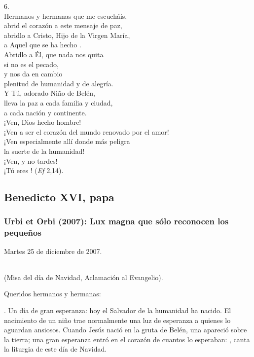 \begin{body}
\begin{body}
6. \\ Hermanos y hermanas que me escucháis,\\ abrid el corazón a este mensaje de paz,\\ abridlo a Cristo, Hijo de la Virgen María,\\ a Aquel que se ha hecho .\\ Abridlo a Él, que nada nos quita\\ si no es el pecado,\\ y nos da en cambio\\ plenitud de humanidad y de alegría.\\ Y Tú, adorado Niño de Belén,\\ lleva la paz a cada familia y ciudad,\\ a cada nación y continente.\\ ¡Ven, Dios hecho hombre!\\ ¡Ven a ser el corazón del mundo renovado por el amor!\\ ¡Ven especialmente allí donde más peligra\\ la suerte de la humanidad!\\ ¡Ven, y no tardes!\\ ¡Tú eres ! (\emph{Ef} 2,14).


\subsection{Benedicto XVI, papa}

\subsubsection{Urbi et Orbi (2007): Lux magna que sólo reconocen los pequeños}

Martes 25 de diciembre de 2007.

\\ (Misa del día de Navidad, Aclamación al Evangelio).

Queridos hermanos y hermanas:

. Un día de gran esperanza: hoy el Salvador de la humanidad ha nacido. El nacimiento de un niño trae normalmente una luz de esperanza a quienes lo aguardan ansiosos. Cuando Jesús nació en la gruta de Belén, una  apareció sobre la tierra; una gran esperanza entró en el corazón de cuantos lo esperaban: , canta la liturgia de este día de Navidad.


\end{body}
\end{body}
